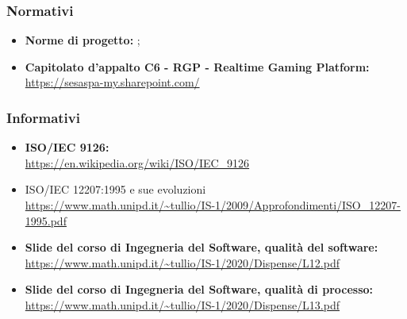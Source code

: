 		\subsubsection{Normativi}
		\begin{itemize}
			\item \textbf{Norme di progetto:} ;
			\item \textbf{Capitolato d’appalto C6 - RGP - Realtime Gaming Platform:}\\
			\href{https://sesaspa-my.sharepoint.com/personal/s_dindo_vargroup_it/_layouts/15/onedrive.aspx?id=%2Fpersonal%2Fs%5Fdindo%5Fvargroup%5Fit%2FDocuments%2FDownload%2Fupload%2FIngegneria%5Fsoftware%2FCapitolato%5FIngegneria%5Fsoftware%2Epdf&parent=%2Fpersonal%2Fs%5Fdindo%5Fvargroup%5Fit%2FDocuments%2FDownload%2Fupload%2FIngegneria%5Fsoftware&originalPath=aHR0cHM6Ly9zZXNhc3BhLW15LnNoYXJlcG9pbnQuY29tLzpiOi9nL3BlcnNvbmFsL3NfZGluZG9fdmFyZ3JvdXBfaXQvRVRodmF5MGY2S1ZDb1h5ZFlPY2UybGtCdC1NWWNuVzF5YWZSWEZYVklPSXNIZz9ydGltZT1jQjNzY3NxczJFZw}{https://sesaspa-my.sharepoint.com/}
		\end{itemize}
		\subsubsection{Informativi}
		\begin{itemize}
			\item \textbf{ISO/IEC 9126:}\\
			\url{https://en.wikipedia.org/wiki/ISO/IEC_9126}
			
			\item ISO/IEC 12207:1995 e sue evoluzioni \\
			\url{https://www.math.unipd.it/~tullio/IS-1/2009/Approfondimenti/ISO_12207-1995.pdf}
			
			\item \textbf{Slide del corso di Ingegneria del Software, qualità del software:}\\
			\url{https://www.math.unipd.it/~tullio/IS-1/2020/Dispense/L12.pdf}
			
			\item \textbf{Slide del corso di Ingegneria del Software, qualità di processo:}\\
			\url{https://www.math.unipd.it/~tullio/IS-1/2020/Dispense/L13.pdf}
		
		\end{itemize}
	